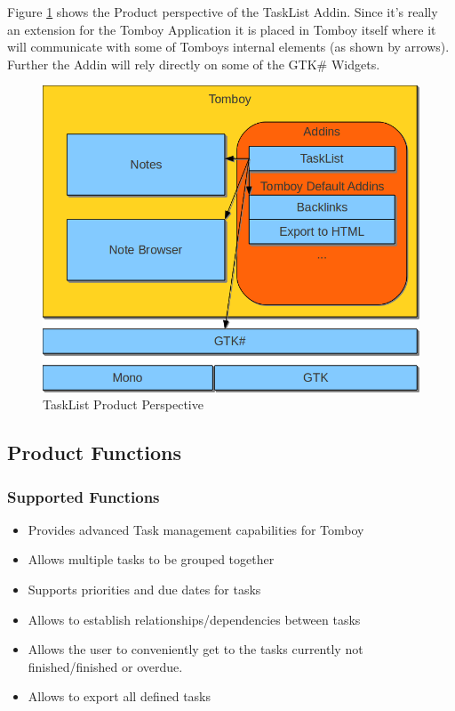   Figure \ref{perspective} shows the Product perspective of the TaskList Addin. Since it's really an extension for the Tomboy Application it is placed in Tomboy itself where it will communicate with some of Tomboys internal elements (as shown by arrows). Further the Addin will rely directly on some of the GTK\# Widgets.
  \begin{figure}[ht]
    \includegraphics[width=\textwidth]{graphics/product_perspective_diagram.png}
    \caption{TaskList Product Perspective}
    \label{perspective}
  \end{figure}


\subsection{Product Functions}
\label{description:functions}

  \subsubsection*{Supported Functions}
  \label{description:functions:supported}

    \begin{itemize}
      \item Provides advanced Task management capabilities for Tomboy
      \item Allows multiple tasks to be grouped together
      \item Supports priorities and due dates for tasks
      \item Allows to establish relationships/dependencies between tasks
      \item Allows the user to conveniently get to the tasks currently not finished/finished or overdue.
      \item Allows to export all defined tasks
    \end{itemize}

